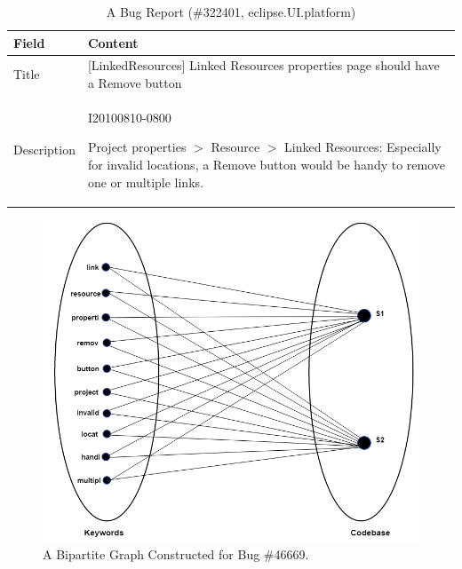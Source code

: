 \documentclass[conference]{IEEEtran}
\begin{document}
\begin{table}[htbp]
	\caption{A Bug Report (\#322401, eclipse.UI.platform)}
	\label{tab:BugInfo2}
	\begin{center}
		\begin{tabular}{ p{1.5cm} | p{6cm}}
			\hline
			\textbf{Field}  & \textbf{Content} \\
			\hline
			\hline Title &
		[LinkedResources] Linked Resources properties page should have a Remove button
			\\ \hline
		   Description &  I20100810-0800
		   
		   Project properties $>$ Resource $>$ Linked Resources:
		   Especially for invalid locations, a Remove button would be handy to remove one or multiple links. \\
			\hline
		\end{tabular}
	\end{center}
\end{table}
\begin{figure}
	\centering
	\includegraphics[scale=0.53]{BGraph2}
	\caption{A Bipartite Graph Constructed for Bug \#46669. 
	}
	\label{fig:BipartiteGraph}
\end{figure}
\end{document}
